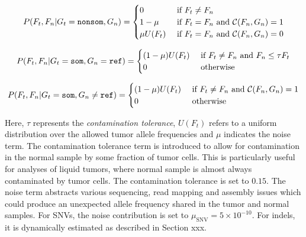 \documentclass{article}
\begin{document}
\begin{equation*}
P(F_t, F_n | G_t = {\tt nonsom}, G_n)=
\begin{cases}
	0 & \text{ if } F_t \neq F_n \\
	1-\mu & \text{ if } F_t = F_n \text{ and }{\cal C}(F_n, G_n) = 1 \\
	\mu U(F_t) & \text{ if } F_t = F_n \text{ and }{\cal C}(F_n, G_n) = 0 \\
\end{cases}
\end{equation*}

\begin{equation*}
P(F_t, F_n | G_t = {\tt som}, G_n = {\tt ref})=
\begin{cases}
	(1-\mu)U(F_t) & \text{ if } F_t \neq F_n \text{ and } F_n \leq \tau F_t \\
	0 & \text{ otherwise } \\
\end{cases}
\end{equation*}

\begin{equation*}
P(F_t, F_n | G_t = {\tt som}, G_n \neq {\tt ref})=
\begin{cases}
	(1-\mu)U(F_t) & \text{ if } F_t \neq F_n \text{ and } {\cal C}(F_n, G_n) = 1\\
	0 & \text{ otherwise } \\
\end{cases}
\end{equation*}

\noindent Here, $\tau$ represents the {\em contamination tolerance}, $U(F_t)$ refers to a uniform distribution over the allowed tumor allele frequencies and $\mu$ indicates the noise term. The contamination tolerance term is introduced to allow for contamination in the normal sample by some fraction of tumor cells. This is particularly useful for analyses of liquid tumors, where normal sample is almost always contaminated by tumor cells. The contamination tolerance is set to $0.15$. The noise term abstracts various sequencing, read mapping and assembly issues which could produce an unexpected allele frequency shared in the tumor and normal samples. For SNVs, the noise contribution is set to $\mu_{\text{SNV}} = 5 \times 10^{-10}$. For indels, it is dynamically estimated as described in Section xxx.

\end{document}
